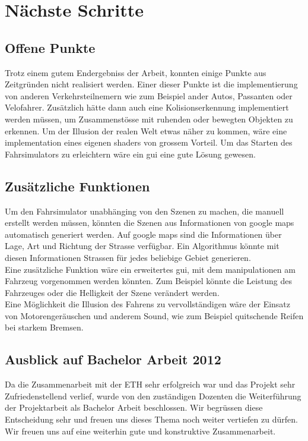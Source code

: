 \section{Nächste Schritte}
\subsection{Offene Punkte}
Trotz einem gutem Endergebniss der Arbeit, konnten einige Punkte aus Zeitgründen nicht realisiert werden. Einer dieser Punkte ist die implementierung von anderen Verkehrsteilnemern wie zum Beispiel ander Autos, Passanten oder Velofahrer. Zusätzlich hätte dann auch eine Kolisionserkennung implementiert werden müssen, um Zusammenstösse mit ruhenden oder bewegten Objekten zu erkennen. Um der Illusion der realen Welt etwas näher zu kommen, wäre eine implementation eines eigenen \glspl{shader} von grossem Vorteil. Um das Starten des Fahrsimulators zu erleichtern wäre ein \gls{gui} eine gute Lösung gewesen. 
\subsection{Zusätzliche Funktionen}
Um den Fahrsimulator unabhänging von den Szenen zu machen, die manuell erstellt werden müssen, könnten die Szenen aus Informationen von google maps automatisch generiert werden. Auf google maps sind die Informationen über Lage, Art und Richtung der Strasse verfügbar. Ein Algorithmus könnte mit diesen Informationen Strassen für jedes beliebige Gebiet generieren. \\
Eine zusätzliche Funktion wäre ein erweitertes \gls{gui}, mit dem manipulationen am Fahrzeug vorgenommen werden könnten. Zum Beispiel könnte die Leistung des Fahrzeuges oder die Helligkeit der Szene verändert werden.\\
Eine Möglichkeit die Illusion des Fahrens zu vervollständigen wäre der Einsatz von Motorengeräuschen und anderem Sound, wie zum Beispiel quitschende Reifen bei starkem Bremsen. 
\subsection{Ausblick auf Bachelor Arbeit 2012}
Da die Zusammenarbeit mit der ETH sehr erfolgreich war und das Projekt sehr Zufriedenstellend verlief, wurde von den zuständigen Dozenten die Weiterführung der Projektarbeit als Bachelor Arbeit beschlossen. Wir begrüssen diese Entscheidung sehr und freuen uns dieses Thema noch weiter vertiefen zu dürfen. Wir freuen uns auf eine weiterhin gute und konstruktive Zusammenarbeit. 